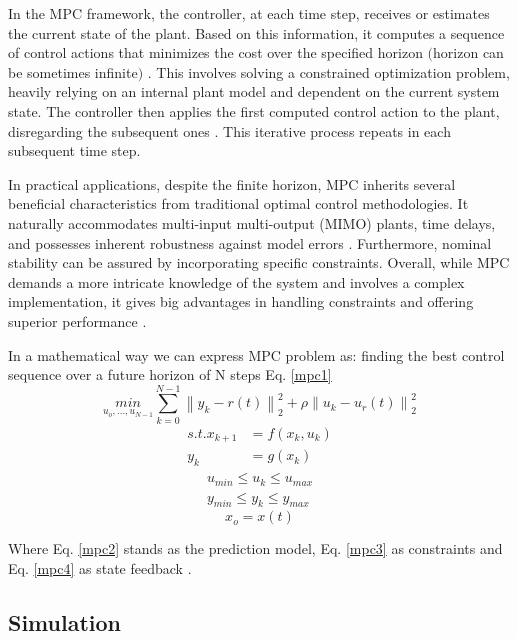 In the MPC framework, the controller, at each time step, receives or estimates the current state of the plant. Based on this information, it computes a sequence of control actions that minimizes the cost over the specified horizon $($horizon can be sometimes infinite$)$ \cite{matlabMPC}\cite{zaklPredRiad}. This involves solving a constrained optimization problem, heavily relying on an internal plant model and dependent on the current system state. The controller then applies the first computed control action to the plant, disregarding the subsequent ones \cite{matlabMPC}. This iterative process repeats in each subsequent time step.

In practical applications, despite the finite horizon, MPC inherits several beneficial characteristics from traditional optimal control methodologies. It naturally accommodates multi-input multi-output (MIMO) plants, time delays, and possesses inherent robustness against model errors \cite{mpcLecture}. Furthermore, nominal stability can be assured by incorporating specific constraints. Overall, while MPC demands a more intricate knowledge of the system and involves a complex implementation, it gives big advantages in handling constraints and offering superior performance \cite{zaklPredRiad}.

In a mathematical way we can express MPC problem as: finding the best control sequence over a future horizon of N steps Eq. \ref{mpc1}
\begin{equation}\label{mpc1}
\underset{u_o,...,u_{N-1}}{min}\sum_{k=0}^{N-1}\left \| y_k-r(t) \right \|_{2}^{2}+\rho \left \| u_k-u_r(t) \right \|_{2}^{2}
\end{equation}
\begin{align}
s.t.	x_{k+1}&=f(x_k,u_k) \label{mpc2}\\ 
	y_k &=g(x_k) \nonumber
\end{align}
\begin{align}
	u_{min}\leq u_k\leq u_{max} \label{mpc3}\\
	y_{min}\leq y_k\leq y_{max} \nonumber
\end{align}
\begin{equation}\label{mpc4}
	x_o=x(t)
\end{equation}

Where Eq. \ref{mpc2} stands as the prediction model, Eq. \ref{mpc3} as constraints and Eq. \ref{mpc4} as state feedback \cite{mpcLecture}. 

\subsection{Simulation}

